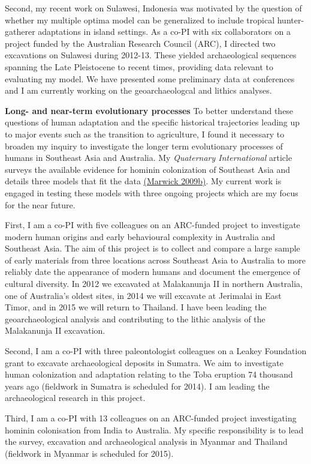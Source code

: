 \documentclass[11pt,article,oneside]{memoir}
\begin{document}
Second, my recent work on Sulawesi, Indonesia was motivated by the question of whether my multiple optima model can be generalized to include tropical hunter-gatherer adaptations in island settings. As a co-PI with six collaborators on a project funded by the Australian Research Council (ARC), I directed two excavations on Sulawesi during 2012-13. These yielded archaeological sequences spanning the Late Pleistocene to recent times, providing data relevant to evaluating my model. We have presented some preliminary data at conferences and I am currently working on the geoarchaeologcal and lithics analyses.

\textbf{Long- and near-term evolutionary processes} To better understand these questions of human adaptation and the specific historical trajectories leading up to major events such as the transition to agriculture, I found it necessary to broaden my inquiry to investigate the longer term evolutionary processes of humans in Southeast Asia and Australia. My \textit{Quaternary International} article surveys the available evidence for hominin colonization of Southeast Asia and details three models that fit the data {\href{http://faculty.washington.edu/bmarwick/PDFs/Marwick_2009_QI.pdf}{(Marwick 2009b)}}. My current work is engaged in testing these models with three ongoing projects which are my focus for the near future. 

First, I am a co-PI with five colleagues on an ARC-funded project to investigate modern human origins and early behavioural complexity in Australia and Southeast Asia. The aim of this project is to collect and compare a large sample of early materials from three locations across Southeast Asia to Australia to more reliably date the appearance of modern humans and document the emergence of cultural diversity. In 2012 we excavated at Malakanunja II in northern Australia, one of Australia's oldest sites, in 2014 we will excavate at Jerimalai in East Timor, and in 2015 we will return to Thailand. I have been leading the geoarchaeological analysis and contributing to the lithic analysis of the Malakanunja II excavation. 

Second, I am a co-PI with three paleontologist colleagues on a Leakey Foundation grant to excavate archaeological deposits in Sumatra. We aim to investigate human colonization and adaptation relating to the Toba eruption 74 thousand years ago (fieldwork in Sumatra is scheduled for 2014). I am leading the archaeological research in this project.

Third, I am a co-PI with 13 colleagues on an ARC-funded project investigating hominin colonisation from India to Australia. My specific responsibility is to lead the survey, excavation and archaeological analysis in Myanmar and Thailand (fieldwork in Myanmar is scheduled for 2015).
\end{document}
